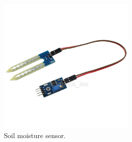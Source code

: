 \begin{figure}[H]\label{moisture_figure}
\centering
\includegraphics[width=0.6\textwidth]{chapters/analysis/figs/soilMoistureSensor.jpg}
\caption{Soil moisture sensor.}
\label{fig:moistureSensor}
\end{figure}
